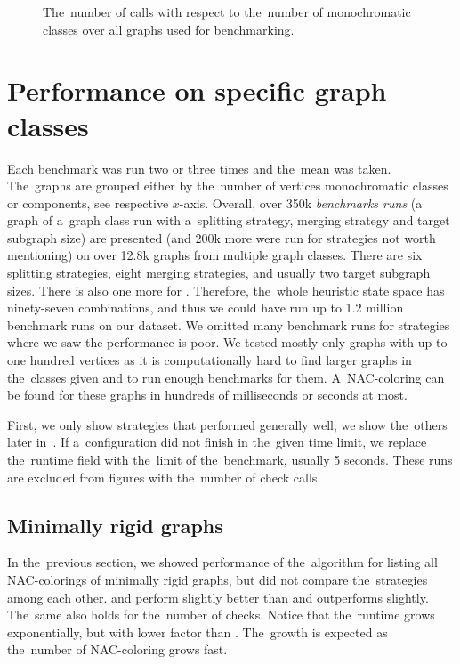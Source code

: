 \begin{figure}[ht]
	\centering
	\scalebox{\BenchFigureScale}{}
	\caption[The number of \IsNACColoring{} calls]{
		The~number of \IsNACColoring{} calls with respect to the~number of monochromatic classes
		over all graphs used for benchmarking.}%
	\label{fig:graph_summary}
\end{figure}%



\section{Performance on specific graph classes}%
\label{sec:bench_graph_classes}

Each benchmark was run two or three times and the~mean was taken.
The~graphs are grouped either by the~number of vertices
monochromatic classes or \trcon{} components, see respective \(x\)-axis.
Overall, over 350k \emph{benchmarks runs}
(a graph of a~graph class run with a~splitting strategy, merging strategy
and target subgraph size)
are presented (and 200k more were run for strategies not worth mentioning)
on over 12.8k graphs from multiple graph classes.
%
There are six splitting strategies, eight merging strategies, and usually two target subgraph sizes.
There is also one more for \NaiveCycles{}.
Therefore, the~whole heuristic state space has ninety-seven combinations,
and thus we could have run up to 1.2 million benchmark runs on our dataset.
We omitted many benchmark runs for strategies where we saw the  performance is poor.
%
We tested mostly only graphs with up to one hundred vertices
as it is computationally hard to find larger graphs in the~classes given
and to run enough benchmarks for them.
A~NAC-coloring can be found for these graphs
in hundreds of milliseconds or seconds at most.

First, we only show strategies that performed generally well,
we show the~others later in~.
If a~configuration did not finish in the~given time limit,
we replace the~runtime field with the~limit of the~benchmark, usually 5 seconds.
These runs are excluded from figures with the~number of check calls.


\subsection*{Minimally rigid graphs}

In the~previous section, we showed performance of the~algorithm for listing
all NAC-colorings of minimally rigid graphs,
but did not compare the~strategies among each other.
%
\Neighbors{} and \NeighborsDegree{} perform slightly better than \None{} and
\SharedVertices{} outperforms \MergeLinear{} slightly.
The~same also holds for the~number of \IsNACColoring{} checks.
Notice that the~runtime grows exponentially, but with lower factor than \NaiveCycles{}.
The~growth is expected as the~number of NAC-coloring grows fast.


